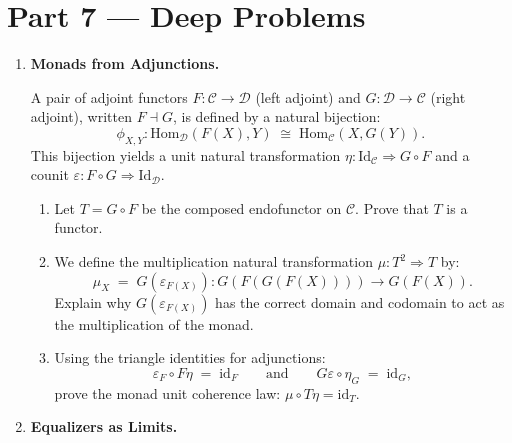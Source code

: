 \documentclass[12pt, a4paper]{article}
\begin{document}
\newpage

\section{Part 7 --- Deep Problems}

\begin{enumerate}[label=\textbf{D\arabic*.}]
  \item \textbf{Monads from Adjunctions.}
  
        A pair of adjoint functors $F: \mathcal{C} \to \mathcal{D}$ (left adjoint) and $G: \mathcal{D} \to \mathcal{C}$ (right adjoint), written $F \dashv G$, is defined by a natural bijection:
        \[
          \phi_{X,Y}: \text{Hom}_{\mathcal{D}}(F(X), Y) \;\cong\; \text{Hom}_{\mathcal{C}}(X, G(Y)).
        \]
        This bijection yields a unit natural transformation $\eta: \text{Id}_{\mathcal{C}} \Rightarrow G \circ F$ and a counit $\varepsilon: F \circ G \Rightarrow \text{Id}_{\mathcal{D}}$.
        \begin{enumerate}[label=(\alph*)]
          \item Let $T = G \circ F$ be the composed endofunctor on $\mathcal{C}$.
                Prove that $T$ is a functor.
          \item We define the multiplication natural transformation $\mu: T^2 \Rightarrow T$ by:
                \[
                  \mu_X \;=\; G(\varepsilon_{F(X)}): G(F(G(F(X)))) \to G(F(X)).
                \]
                Explain why $G(\varepsilon_{F(X)})$ has the correct domain and codomain to act as the multiplication of the monad.
          \item Using the triangle identities for adjunctions:
                \[
                  \varepsilon_F \circ F\eta \;=\; \text{id}_F \qquad \text{and} \qquad G\varepsilon \circ \eta_G \;=\; \text{id}_G,
                \]
                prove the monad unit coherence law: $\mu \circ T\eta = \text{id}_T$.
        \end{enumerate}

  \item \textbf{Equalizers as Limits.}
  

\end{enumerate}
\end{document}
